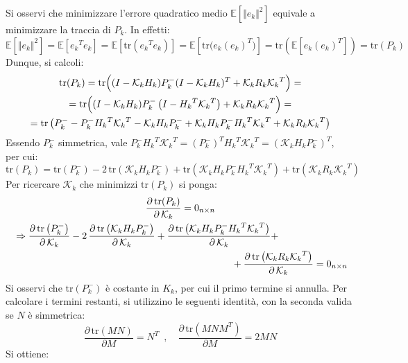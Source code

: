 \documentclass[12pt,a4paper,openright,twoside]{book}
\begin{document}
Si osservi che minimizzare l'errore quadratico medio $\mathbb{E}[\Vert e_k\Vert^2]$ equivale a minimizzare la traccia di $P_k$. In effetti:
$$\mathbb{E}[\Vert e_k\Vert^2]=\mathbb{E}[{e_k}^Te_k]=\mathbb{E}[\mathrm{tr}({e_k}^Te_k)]=\mathbb{E}\left[\mathrm{tr}\bigl(e_k(e_k)^T\bigr)\right]=\mathrm{tr}\left(\mathbb{E}\left[e_k(e_k)^T\right]\right)=\mathrm{tr}(P_k)$$
Dunque, si calcoli:
\begin{gather*}
\mathrm{tr}(P_k)=\mathrm{tr}\Bigl((I-\mathcal{K}_kH_k)P_k^-(I-\mathcal{K}_kH_k)^T+\mathcal{K}_kR_k{\mathcal{K}_k}^T\Bigr)= \\
=\mathrm{tr}\Bigl((I-\mathcal{K}_kH_k)P_k^-\left(I-{H_k}^T{\mathcal{K}_k}^T\right)+\mathcal{K}_kR_k{\mathcal{K}_k}^T\Bigr)= \\
=\mathrm{tr}\left(P_k^--P_k^-{H_k}^T{\mathcal{K}_k}^T-\mathcal{K}_kH_kP_k^-+\mathcal{K}_kH_kP_k^-{H_k}^T{\mathcal{K}_k}^T+\mathcal{K}_kR_k{\mathcal{K}_k}^T\right)
\end{gather*}
Essendo $P_k^-$ simmetrica, vale $P_k^-{H_k}^T{\mathcal{K}_k}^T=(P_k^-)^T{H_k}^T{\mathcal{K}_k}^T=(\mathcal{K}_kH_kP_k^-)^T$, \\
per cui:
$$\mathrm{tr}(P_k)=\mathrm{tr}\left(P_k^-\right)-2\,\mathrm{tr}\left(\mathcal{K}_kH_kP_k^-\right)+\mathrm{tr}\left(\mathcal{K}_kH_kP_k^-{H_k}^T{\mathcal{K}_k}^T\right)+\mathrm{tr}\left(\mathcal{K}_kR_k{\mathcal{K}_k}^T\right)$$
Per ricercare $\mathcal{K}_k$ che minimizzi $\mathrm{tr}(P_k)$ si ponga:
\begin{gather*}
\dfrac{\partial\,\mathrm{tr}(P_k)}{\partial\,\mathcal{K}_k}=0_{n\times n} \\
\begin{multlined}[\textwidth]
\Rightarrow \dfrac{\partial\,\mathrm{tr}\left(P_k^-\right)}{\partial\,\mathcal{K}_k}-2\,\dfrac{\partial\,\mathrm{tr}\left(\mathcal{K}_kH_kP_k^-\right)}{\partial\,\mathcal{K}_k}+\dfrac{\partial\,\mathrm{tr}\left(\mathcal{K}_kH_kP_k^-{H_k}^T{\mathcal{K}_k}^T\right)}{\partial\,\mathcal{K}_k}+ \\
+\dfrac{\partial\,\mathrm{tr}\left(\mathcal{K}_kR_k{\mathcal{K}_k}^T\right)}{\partial\,\mathcal{K}_k}=0_{n\times n}
\end{multlined}
\end{gather*}
Si osservi che $\mathrm{tr}(P_k^-)$ è costante in $K_k$, per cui il primo termine si annulla. Per calcolare i termini restanti, si utilizzino le seguenti identità, con la seconda valida se $N$ è simmetrica:
$$\dfrac{\partial\,\mathrm{tr}(MN)}{\partial M}=N^T\enspace,\quad\dfrac{\partial\,\mathrm{tr}(MNM^T)}{\partial M}=2MN$$
Si ottiene:
\end{document}
